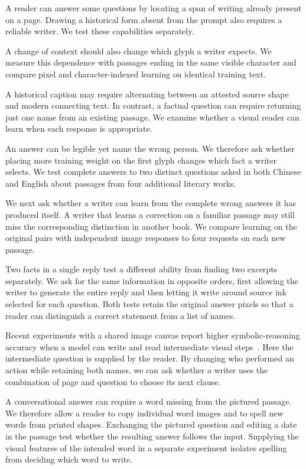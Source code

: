 \documentclass[12pt,a4paper]{article}
\providecommand{\DIFadd}[1]{{\protect\color{blue} \sf #1}} %
\begin{document}
\DIFadd{A reader can answer some questions by locating a span of writing already
present on a page. Drawing a historical form absent from the prompt also
requires a reliable writer. We test these capabilities separately.
}

\DIFadd{A change of context should also change which glyph a writer expects. We
measure this dependence with passages ending in the same visible character
and compare pixel and character-indexed learning on identical training text.
}

\DIFadd{A historical caption may require alternating between an attested source shape
and modern connecting text. In contrast, a factual question can require
returning just one name from an existing passage. We examine whether a
visual reader can learn when each response is appropriate.
}

\DIFadd{An answer can be legible yet name the wrong person. We therefore ask whether placing more training weight on the first glyph changes which fact a writer selects. We test complete answers to two distinct questions asked in both Chinese and English about passages from four additional literary works.
}

\DIFadd{We next ask whether a writer can learn from the complete wrong answers it has produced itself. A writer that learns a correction on a familiar passage may still miss the corresponding distinction in another book. We compare learning on the original pairs with independent image responses to four requests on each new passage.
}

\DIFadd{Two facts in a single reply test a different ability from finding two excerpts separately. We ask for the same information in opposite orders, first allowing the writer to generate the entire reply and then letting it write around source ink selected for each question. Both tests retain the original answer pixels so that a reader can distinguish a correct statement from a list of names.
}

\DIFadd{Recent experiments with a shared image canvas report higher symbolic-reasoning accuracy when a model can write and read intermediate visual steps~\cite{chucanvas}. Here the intermediate question is supplied by the reader. By changing who performed an action while retaining both names, we can ask whether a writer uses the combination of page and question to choose its next clause.
}

\DIFadd{A conversational answer can require a word missing from the pictured passage. We therefore allow a reader to copy individual word images and to spell new words from printed shapes. Exchanging the pictured question and editing a date in the passage test whether the resulting answer follows the input. Supplying the visual features of the intended word in a separate experiment isolates spelling from deciding which word to write.
}
\end{document}
